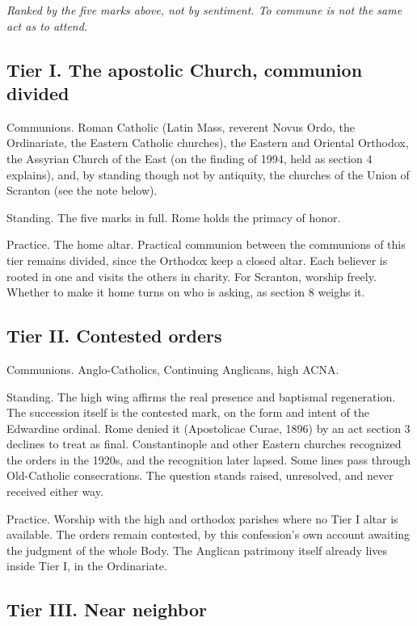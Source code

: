 \documentclass[11pt,twoside]{article}
\begin{document}
\emph{Ranked by the five marks above, not by sentiment. To commune is not the same act as to attend.}

\subsection*{Tier I. The apostolic Church, communion divided}

Communions. Roman Catholic (Latin Mass, reverent Novus Ordo, the Ordinariate, the Eastern Catholic churches), the Eastern and Oriental Orthodox, the Assyrian Church of the East (on the finding of 1994, held as section 4 explains), and, by standing though not by antiquity, the churches of the Union of Scranton (see the note below).

Standing. The five marks in full. Rome holds the primacy of honor.

Practice. The home altar. Practical communion between the communions of this tier remains divided, since the Orthodox keep a closed altar. Each believer is rooted in one and visits the others in charity. For Scranton, worship freely. Whether to make it home turns on who is asking, as section 8 weighs it.

\subsection*{Tier II. Contested orders}

Communions. Anglo-Catholics, Continuing Anglicans, high ACNA.

Standing. The high wing affirms the real presence and baptismal regeneration. The succession itself is the contested mark, on the form and intent of the Edwardine ordinal. Rome denied it (Apostolicae Curae, 1896) by an act section 3 declines to treat as final. Constantinople and other Eastern churches recognized the orders in the 1920s, and the recognition later lapsed. Some lines pass through Old-Catholic consecrations. The question stands raised, unresolved, and never received either way.

Practice. Worship with the high and orthodox parishes where no Tier I altar is available. The orders remain contested, by this confession's own account awaiting the judgment of the whole Body. The Anglican patrimony itself already lives inside Tier I, in the Ordinariate.

\subsection*{Tier III. Near neighbor}
\end{document}
